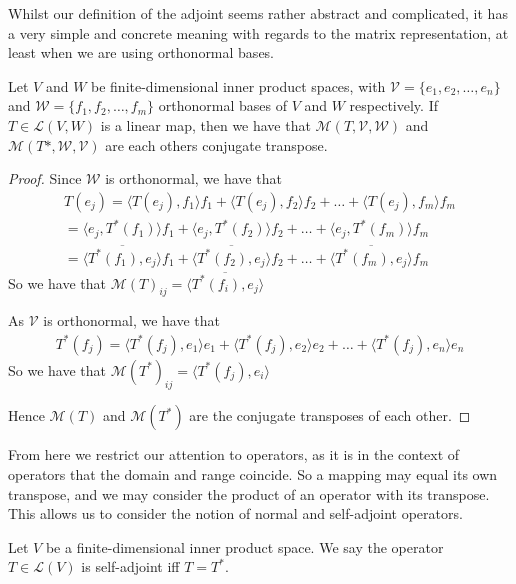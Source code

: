 \documentclass[]{article}
\begin{document}
Whilst our definition of the adjoint seems rather abstract and complicated, it has a very simple and concrete meaning with regards to the matrix representation, at least when we are using orthonormal bases.

\begin{thm} 
		Let $V$ and $W$ be finite-dimensional inner product spaces, with $\mathcal{V} = \{e_1, e_2, \ldots, e_n\}$ and $\mathcal{W} = \{f_1, f_2, \ldots, f_m\}$ orthonormal bases of $V$ and $W$ respectively. If $T \in \mathcal{L}(V,W)$ is a linear map, then we have that $\mathcal{M}(T,\mathcal{V},\mathcal{W})$ and $\mathcal{M}(T*,\mathcal{W},\mathcal{V})$ are each others conjugate transpose.
\end{thm}

\begin{proof}
	Since $\mathcal{W}$ is orthonormal, we have that
	\begin{align*}
			T(e_j) = \langle T(e_j), f_1 \rangle f_1 + \langle T(e_j), f_2 \rangle f_2 + \ldots + \langle T(e_j), f_m \rangle f_m \\
			= \langle e_j, T^*(f_1) \rangle f_1 + \langle e_j, T^*(f_2) \rangle f_2 + \ldots + \langle e_j, T^*(f_m) \rangle f_m \\
			= \overline{\langle T^*(f_1), e_j \rangle} f_1 + \overline{\langle T^*(f_2), e_j \rangle} f_2 + \ldots + \overline{\langle T^*(f_m), e_j \rangle } f_m
	\end{align*}
	So we have that $\mathcal{M}(T)_{ij} = \overline{\langle T^*(f_i), e_j \rangle }$

	As $\mathcal{V}$ is orthonormal, we have that
	\begin{align*}
			T^*(f_j) = \langle T^*(f_j), e_1 \rangle e_1 + \langle T^*(f_j), e_2 \rangle e_2 + \ldots + \langle T^*(f_j), e_n \rangle e_n
	\end{align*}
	So we have that $\mathcal{M}(T^*)_{ij} = \langle T^*(f_j), e_i \rangle $

	Hence $\mathcal{M}(T)$ and $\mathcal{M}(T^*)$ are the conjugate transposes of each other.
\end{proof}

From here we restrict our attention to operators, as it is in the context of operators that the domain and range coincide. So a mapping may equal its own transpose, and we may consider the product of an operator with its transpose. This allows us to consider the notion of normal and self-adjoint operators.

\begin{defi} 
		Let $V$ be a finite-dimensional inner product space. We say the operator $T \in \mathcal{L}(V)$ is self-adjoint iff $T = T^*$.	
\end{defi}
\end{document}
